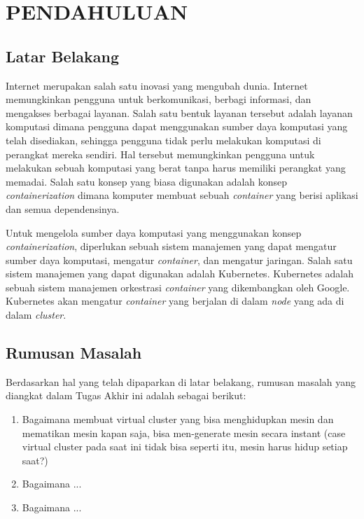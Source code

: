 \chapter{PENDAHULUAN}

\section{Latar Belakang}

Internet merupakan salah satu inovasi yang mengubah dunia. Internet
memungkinkan pengguna untuk berkomunikasi, berbagi informasi, dan
mengakses berbagai layanan. Salah satu bentuk layanan tersebut adalah
layanan komputasi dimana pengguna dapat menggunakan sumber daya komputasi
yang telah disediakan, sehingga pengguna tidak perlu melakukan komputasi
di perangkat mereka sendiri. Hal tersebut memungkinkan pengguna untuk melakukan
sebuah komputasi yang berat tanpa harus memiliki perangkat yang memadai.
Salah satu konsep yang biasa digunakan adalah konsep \emph{containerization}
dimana komputer membuat sebuah \emph{container} yang berisi
aplikasi dan semua dependensinya.

Untuk mengelola sumber daya komputasi yang menggunakan konsep \emph{containerization},
diperlukan sebuah sistem manajemen yang dapat mengatur sumber daya komputasi,
mengatur \emph{container}, dan mengatur jaringan. Salah satu sistem manajemen
yang dapat digunakan adalah Kubernetes. Kubernetes adalah sebuah sistem manajemen
orkestrasi \emph{container} yang dikembangkan oleh Google. Kubernetes akan mengatur
\emph{container} yang berjalan di dalam \emph{node} yang ada di dalam \emph{cluster}.

\section{Rumusan Masalah}

Berdasarkan hal yang telah dipaparkan di latar belakang, rumusan masalah
yang diangkat dalam Tugas Akhir ini adalah sebagai berikut:
\begin{enumerate}
  \vspace{-0.3cm}\item{Bagaimana membuat virtual cluster yang bisa
  menghidupkan mesin dan mematikan mesin kapan saja, bisa men-generate
  mesin secara instant (case virtual cluster pada saat ini tidak bisa seperti itu,
  mesin harus hidup setiap saat?)}
  \vspace{-0.3cm}\item{Bagaimana ...}
  \vspace{-0.3cm}\item{Bagaimana ...}
\end{enumerate}

